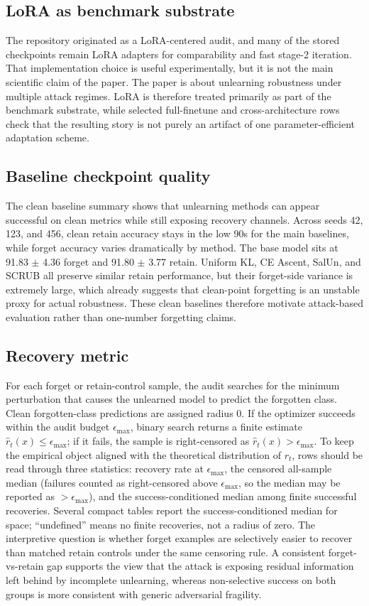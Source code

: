 \documentclass{article}
\begin{document}
\subsection{LoRA as benchmark substrate}
The repository originated as a LoRA-centered audit, and many of the stored checkpoints remain LoRA adapters for comparability and fast stage-2 iteration. That implementation choice is useful experimentally, but it is not the main scientific claim of the paper. The paper is about unlearning robustness under multiple attack regimes. LoRA is therefore treated primarily as part of the benchmark substrate, while selected full-finetune and cross-architecture rows check that the resulting story is not purely an artifact of one parameter-efficient adaptation scheme.

\subsection{Baseline checkpoint quality}
The clean baseline summary shows that unlearning methods can appear successful on clean metrics while still exposing recovery channels. Across seeds 42, 123, and 456, clean retain accuracy stays in the low 90s for the main baselines, while forget accuracy varies dramatically by method. The base model sits at 91.83 $\pm$ 4.36 forget and 91.80 $\pm$ 3.77 retain. Uniform KL, CE Ascent, SalUn, and SCRUB all preserve similar retain performance, but their forget-side variance is extremely large, which already suggests that clean-point forgetting is an unstable proxy for actual robustness. These clean baselines therefore motivate attack-based evaluation rather than one-number forgetting claims.

\subsection{Recovery metric}
For each forget or retain-control sample, the audit searches for the minimum perturbation that causes the unlearned model to predict the forgotten class. Clean forgotten-class predictions are assigned radius $0$. If the optimizer succeeds within the audit budget $\epsilon_{\max}$, binary search returns a finite estimate $\hat r_t(x)\leq\epsilon_{\max}$; if it fails, the sample is right-censored as $\hat r_t(x)>\epsilon_{\max}$. To keep the empirical object aligned with the theoretical distribution of $r_t$, rows should be read through three statistics: recovery rate at $\epsilon_{\max}$, the censored all-sample median (failures counted as right-censored above $\epsilon_{\max}$, so the median may be reported as $>\epsilon_{\max}$), and the success-conditioned median among finite successful recoveries. Several compact tables report the success-conditioned median for space; ``undefined'' means no finite recoveries, not a radius of zero. The interpretive question is whether forget examples are selectively easier to recover than matched retain controls under the same censoring rule. A consistent forget-vs-retain gap supports the view that the attack is exposing residual information left behind by incomplete unlearning, whereas non-selective success on both groups is more consistent with generic adversarial fragility.
\end{document}
